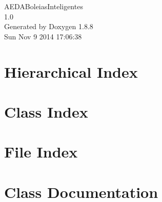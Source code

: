 \documentclass[twoside]{book}
\newcommand{\+}{\discretionary{\mbox{\scriptsize$\hookleftarrow$}}{}{}}
\newcommand{\clearemptydoublepage}{%
  \newpage{\pagestyle{empty}\cleardoublepage}%
}
\begin{document}
\hypersetup{pageanchor=false,
             bookmarks=true,
             bookmarksnumbered=true,
             pdfencoding=unicode
            }
\begin{titlepage}
\vspace*{7cm}
\begin{center}%
{\Large A\+E\+D\+A\+Boleias\+Inteligentes \\[1ex]\large 1.\+0 }\\
\vspace*{1cm}
{\large Generated by Doxygen 1.8.8}\\
\vspace*{0.5cm}
{\small Sun Nov 9 2014 17:06:38}\\
\end{center}
\end{titlepage}
\clearemptydoublepage
\tableofcontents
\clearemptydoublepage
{}
\hypersetup{pageanchor=true}

\chapter{Hierarchical Index}

\chapter{Class Index}

\chapter{File Index}

\chapter{Class Documentation}


























\end{document}
